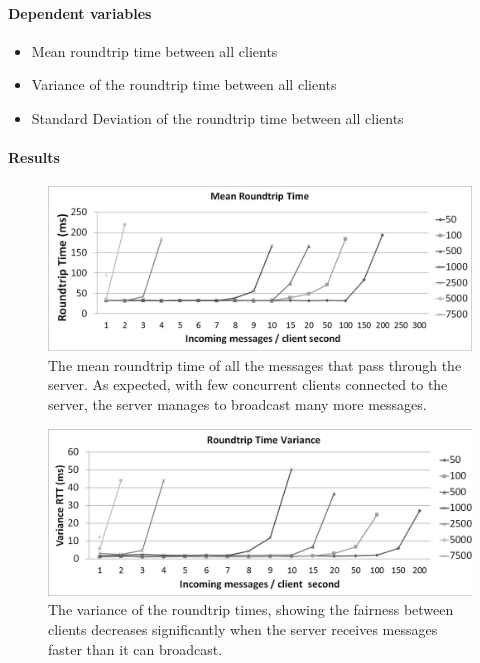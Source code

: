 \documentclass[12pt]{article}
\begin{document}
\paragraph{Dependent variables}
\begin{itemize}
\item Mean roundtrip time between all clients
\item Variance of the roundtrip time between all clients
\item Standard Deviation of the roundtrip time between all clients
\end{itemize}

\paragraph{Results}
\begin{center}

\begin{figure}[h]
\label{fig:broadcast_rtt_mean}
\includegraphics[scale=0.32]{test_SERVER_RTTmean.jpg}
\caption{The mean roundtrip time of all the messages that pass through the server. As expected, with few concurrent clients connected to the server, the server manages to broadcast many more messages.}
\end{figure}


\begin{figure}
\label{fig:broadcast_rtt_variance}
\includegraphics[scale=0.32]{test_SERVER_RTTvariance.jpg}
\caption{The variance of the roundtrip times, showing the fairness between clients decreases significantly when the server receives messages faster than it can broadcast.}
\end{figure}



\end{center}
\end{document}
